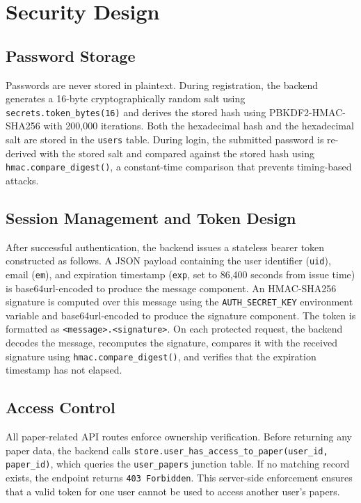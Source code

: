 \documentclass[12pt,a4paper]{report}
\begin{document}
\section{Security Design}

\subsection{Password Storage}

Passwords are never stored in plaintext. During registration, the backend
generates a 16-byte cryptographically random salt using
\texttt{secrets.token\_bytes(16)} and derives the stored hash using
PBKDF2-HMAC-SHA256 with 200{,}000 iterations. Both the hexadecimal hash and
the hexadecimal salt are stored in the \texttt{users} table. During login,
the submitted password is re-derived with the stored salt and compared against
the stored hash using \texttt{hmac.compare\_digest()}, a constant-time
comparison that prevents timing-based attacks.

\subsection{Session Management and Token Design}

After successful authentication, the backend issues a stateless bearer token
constructed as follows. A JSON payload containing the user identifier
(\texttt{uid}), email (\texttt{em}), and expiration timestamp (\texttt{exp},
set to 86{,}400 seconds from issue time) is base64url-encoded to produce the
message component. An HMAC-SHA256 signature is computed over this message
using the \texttt{AUTH\_SECRET\_KEY} environment variable and
base64url-encoded to produce the signature component. The token is formatted
as \texttt{<message>.<signature>}. On each protected request, the backend
decodes the message, recomputes the signature, compares it with the received
signature using \texttt{hmac.compare\_digest()}, and verifies that the
expiration timestamp has not elapsed.

\subsection{Access Control}

All paper-related API routes enforce ownership verification. Before returning
any paper data, the backend calls
\texttt{store.user\_has\_access\_to\_paper(user\_id, paper\_id)}, which
queries the \texttt{user\_papers} junction table. If no matching record
exists, the endpoint returns \texttt{403 Forbidden}. This server-side
enforcement ensures that a valid token for one user cannot be used to access
another user's papers.
\end{document}
